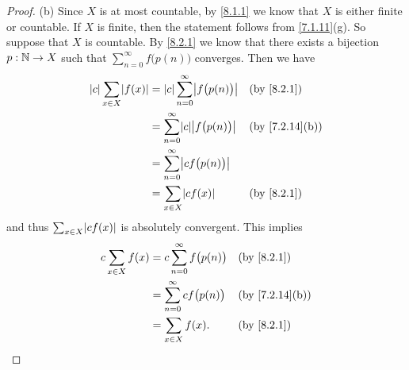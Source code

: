 \begin{proof}{(b)}
  Since \(X\) is at most countable, by \cref{8.1.1} we know that \(X\) is either finite or countable.
  If \(X\) is finite, then the statement follows from \cref{7.1.11}(g).
  So suppose that \(X\) is countable.
  By \cref{8.2.1} we know that there exists a bijection \(p : \mathbb{N} \to X\) such that \(\sum_{n = 0}^\infty f\big(p(n)\big)\) converges.
  Then we have
  \begin{align*}
    \abs{c} \sum_{x \in X} \abs{f(x)} & = \abs{c} \sum_{n = 0}^\infty \abs{f\big(p(n)\big)} &  & \text{(by \cref{8.2.1})}     \\
                                      & = \sum_{n = 0}^\infty \abs{c} \abs{f\big(p(n)\big)} &  & \text{(by \cref{7.2.14}(b))} \\
                                      & = \sum_{n = 0}^\infty \abs{c f\big(p(n)\big)}                                         \\
                                      & = \sum_{x \in X} \abs{c f(x)}                       &  & \text{(by \cref{8.2.1})}
  \end{align*}
  and thus \(\sum_{x \in X} \abs{c f(x)}\) is absolutely convergent.
  This implies
  \begin{align*}
    c \sum_{x \in X} f(x) & = c \sum_{n = 0}^\infty f\big(p(n)\big) &  & \text{(by \cref{8.2.1})}     \\
                          & = \sum_{n = 0}^\infty c f\big(p(n)\big) &  & \text{(by \cref{7.2.14}(b))} \\
                          & = \sum_{x \in X} f(x).                  &  & \text{(by \cref{8.2.1})}
  \end{align*}
\end{proof}

